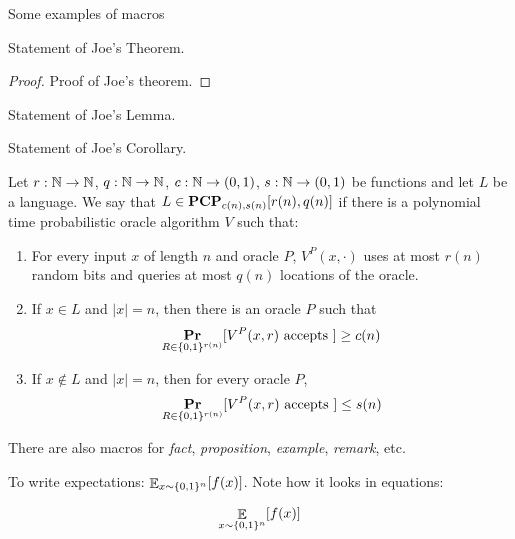 \documentclass[11pt]{article}
\begin{document}

Some examples of macros

\begin{theorem} Statement of Joe's Theorem.
\end{theorem}


\begin{proof}
Proof of Joe's theorem.
\end{proof}


\begin{lemma} Statement of Joe's Lemma.
\end{lemma}

\begin{corollary} Statement of Joe's Corollary.
\end{corollary}

\begin{definition} [PCP]
Let $r: \mbox{$\mathbb N$} \to \mbox{$\mathbb N$}$, $q: \mbox{$\mathbb N$} \to \mbox{$\mathbb N$}$, $c: \mbox{$\mathbb N$} \to (0,1)$, $s: \mbox{$\mathbb N$} \to (0,1)$ be functions
and let $L$ be a language. We say that $L \in \mbox{\bf PCP}_{c(n),s(n)}[r(n),q(n)]$ if
there is a polynomial time probabilistic oracle algorithm $V$ such that:
\begin{enumerate}
\item For every input $x$ of length $n$ and oracle $P$, $V^P(x,\cdot)$ uses at most 
$r(n)$ random bits and queries at most $q(n)$ locations of the oracle.
\item If $x\in L$ and $|x|=n$, then there is an oracle $P$ such that 
\begin {align} \mathop{\bf {Pr}}_{R\in \{0,1\}^{r(n)}} [ V^P(x,r) \mbox { accepts } ] \geq c(n) \end{align}
\item If $x\not\in L$ and $|x|=n$, then for every oracle $P$, 
\begin {align} \mathop{\bf {Pr}}_{R\in \{0,1\}^{r(n)}} [ V^P(x,r) \mbox { accepts } ] \leq s(n) \end{align}
\end{enumerate}
\end{definition}

There are also macros for {\em fact}, {\em proposition}, {\em example}, {\em remark}, etc.

To write expectations: $\mathop\mathbb{E}_{x \sim \{0,1\}^n} [ f(x)]$. Note how it looks in equations:

\begin{equation}
\mathop\mathbb{E}_{x \sim \{0,1\}^n} [ f(x)]
\end{equation}
\end{document}

